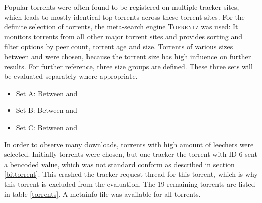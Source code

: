 \documentclass[10pt, a4paper, twoside=false, headsepline]{scrbook}
\renewcommand{\_}{\origunderscore\allowbreak}
\begin{document}
Popular torrents were often found to be registered on multiple tracker sites, which leads to mostly identical top torrents across these torrent sites. For the definite selection of torrents, the meta-search engine \textsc{Torrentz} \cite{torrentz} was used: It monitors torrents from all other major torrent sites and provides sorting and filter options by peer count, torrent age and size.
Torrents of various sizes between  and  were chosen, because the torrent size has high influence on further results. For further reference, three size groups are defined. These three sets will be evaluated separately where appropriate.
\begin{itemize}
\item Set A: Between  and 
\item Set B: Between  and 
\item Set C: Between  and 
\end{itemize}

In order to observe many downloads, torrents with high amount of leechers were selected. Initially  torrents were chosen, but one tracker the torrent with ID 6 sent a bencoded value, which was not standard conform as described in section \ref{bittorrent}. This crashed the tracker request thread for this torrent, which is why this torrent is excluded from the evaluation. The 19 remaining torrents are listed in table \ref{torrents}. A metainfo file was available for all torrents.
\end{document}
